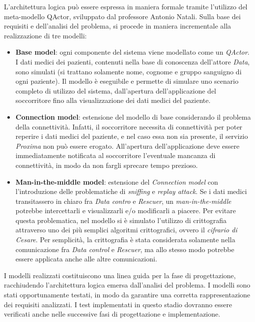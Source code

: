 \documentclass[a4paper,12pt]{report}
\begin{document}
L'architettura logica può essere espressa in maniera formale tramite l’utilizzo del meta-modello
QActor, sviluppato dal professore Antonio Natali. Sulla base dei requisiti e dell'analisi del problema, si procede in maniera incrementale alla realizzazione di tre modelli:
\begin{itemize}
	\item \textbf{Base model}: ogni componente del sistema viene modellato come un \emph{QActor}. I dati medici dei pazienti, contenuti nella base di conoscenza dell'attore \emph{Data}, sono simulati (si trattano solamente nome, cognome e gruppo sanguigno di ogni paziente). Il modello è eseguibile e permette di simulare uno scenario completo di utilizzo del sistema, dall'apertura dell'applicazione del soccorritore fino alla visualizzazione dei dati medici del paziente.
	\item \textbf{Connection model}: estensione del modello di base considerando il problema della connettività. Infatti, il soccorritore necessita di connettività per poter reperire i dati medici del paziente, e nel caso essa non sia presente, il servizio \emph{Proxima} non può essere erogato. All'apertura dell'applicazione deve essere immediatamente notificata al soccorritore l'eventuale mancanza di connettività, in modo da non fargli sprecare tempo prezioso.
	\item \textbf{Man-in-the-middle model}: estensione del \emph{Connection model} con l'introduzione delle problematiche di \emph{sniffing} e \emph{replay attack}. Se i dati medici transitassero in chiaro fra \emph{Data contro} e \emph{Rescuer}, un \emph{man-in-the-middle} potrebbe intercettarli e visualizzarli e/o modificarli a piacere. Per evitare questa problematica, nel modello si è simulato l'utilizzo di crittografia attraverso uno dei più semplici algoritmi crittografici, ovvero il \emph{cifrario di Cesare}. Per semplicità, la crittografia è stata considerata solamente nella comunicazione fra \emph{Data control} e \emph{Rescuer}, ma allo stesso modo potrebbe essere applicata anche alle altre comunicazioni.
\end{itemize}

I modelli realizzati costituiscono una linea guida per la fase di progettazione, racchiudendo l'architettura logica emersa dall'analisi del problema. I modelli sono stati opportunamente testati, in modo da garantire una corretta rappresentazione dei requisiti analizzati. I test implementati in questo stadio dovranno essere verificati anche nelle successive fasi di progettazione e implementazione.
\end{document}
